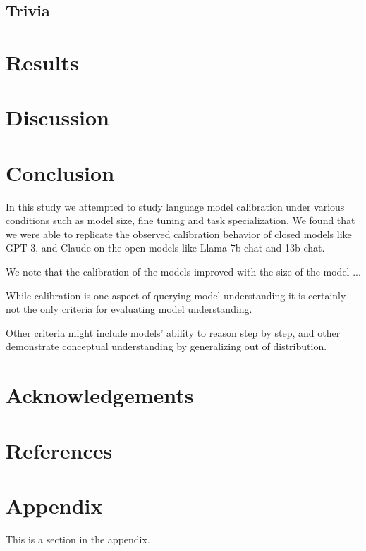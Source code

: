 \documentclass[11pt]{article}
\begin{document}
\subsection{Trivia}


\section{Results}

\section{Discussion}

\section{Conclusion}

In this study we attempted to study language model calibration 
under various conditions such as model size, fine tuning and  
task specialization. We found that we were able to replicate the 
observed  calibration behavior of closed models like GPT-3, and 
Claude on the open models like Llama 7b-chat and 13b-chat. 

We note that the calibration of the models  improved with the size 
of the model ...

While calibration is one aspect of querying model understanding it is 
certainly  not the only criteria for evaluating model understanding.  

Other criteria might include models' ability to reason step by step, 
and other demonstrate conceptual understanding by generalizing 
out of distribution. 

\section{Acknowledgements}

\section{References}




\appendix

\section{Appendix}
\label{sec:appendix}

This is a section in the appendix.
\end{document}
